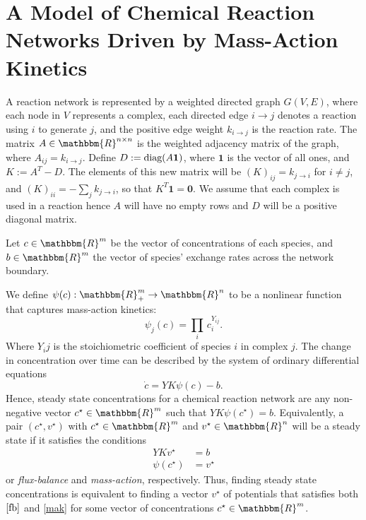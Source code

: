 \documentclass[smallextended]{svjour3}       %
\newcounter{sent}
\newcommand*{\diag}{\mbox{\rm diag}}
\newcommand*{\0}{\mathbf{0}}
\newcommand*{\1}{\mathbf{1}}
\newcommand*{\R}{\mathbbm{R}}
\begin{document}
\section{A Model of Chemical Reaction Networks Driven by Mass-Action Kinetics} 
\label{section:crnt-model}
A reaction network is represented by a weighted directed graph
$G(V,E)$, where each node in $V$ represents a complex, each directed edge
$i\rightarrow j$ denotes a reaction using $i$ to generate $j$, and the
positive edge weight $k_{i\rightarrow j}$ is the reaction rate. The matrix $A
\in \R^{n \times n}$ is the weighted adjacency matrix of the graph, where
$A_{ij}=k_{i\rightarrow j}$.  Define $D := \diag(A\1)$, where $\1$ is the
vector of all ones, and $K := A^T-D$.  The elements of this new matrix will
be $(K)_{ij} = k_{j \rightarrow i}$ for $i \neq j$, and $(K)_{ii} = -\sum_j
k_{j \rightarrow i}$, so that $K^T \1 = \0$.  We assume that each complex
is used in a reaction hence $A$ will have no empty rows and $D$ will 
be a positive diagonal matrix.

Let $c \in \R^m$ be the vector of concentrations of each species, and $b \in
\R^m$ the vector of species' exchange rates across the network boundary.

We define $\psi(c):\R^m_+\rightarrow \R^n$ to be a nonlinear function that
captures mass-action kinetics:
\[
\psi_j(c) = \prod_i\,c_i^{Y_{ij}}.
\]
Where $Y_ij$ is the stoichiometric coefficient of species $i$ in complex $j$.
The change in concentration over time can be described by the system of
ordinary differential equations 
\[
\dot{c} = YK\psi(c) - b.
\] 
\noindent Hence, steady state concentrations for a chemical reaction network
are any non-negative vector $c^\star\in\R^m$ such that $YK\psi(c^\star)=b$.
Equivalently, a pair $(c^\star,v^\star)$ with $c^\star\in\R^m$ and
$v^\star\in\R^n$ will be a steady state if it satisfies the conditions
\begin{align} 
  YKv^\star &=b \label{fb}\tag{FB} \\ \psi(c^\star) &= v^\star
  \label{mak}\tag{MA} 
\end{align}
or \emph{flux-balance} and \emph{mass-action}, respectively. Thus, finding 
steady state concentrations is equivalent to finding a vector $v^\star$ of potentials
that satisfies both $\eqref{fb}$ and \eqref{mak} for some vector of concentrations 
$c^\star\in\R^m$.
\end{document}
